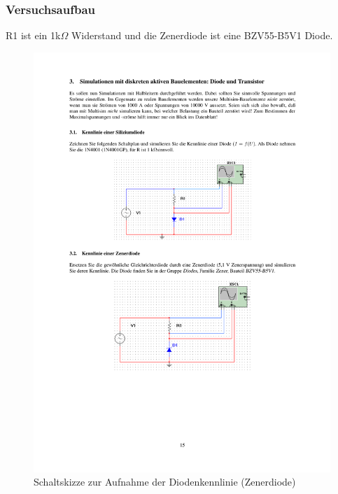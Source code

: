 \documentclass[12pt,a4paper]{article}
\begin{document}
\subsubsection{Versuchsaufbau}

R1 ist ein 1k$\Omega$ Widerstand und die Zenerdiode ist eine BZV55-B5V1 Diode.


\begin{figure}[H] 
  \centering
    \includegraphics[trim = 10mm 70mm 10mm 165mm, clip, scale = 1]{ep5_14[Page15].pdf}
  	\caption[Schaltskizze zur Aufnahme der Diodenkennlinie (Zenerdiode)]{Schaltskizze zur Aufnahme der Diodenkennlinie (Zenerdiode)\footnotemark}
  \label{fig:3.2}
\end{figure}
\end{document}

